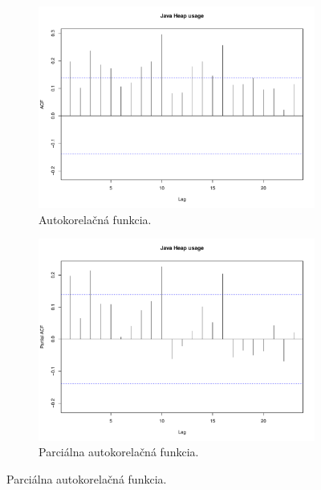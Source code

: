 \documentclass[12pt,a4paper,oneside,final]{article}
\theoremstyle{definition}
\theoremstyle{remark}
\numberwithin{equation}{section}
\begin{document}
\begin{figure}[H] \centering
    \begin{subfigure}[b]{0.45\textwidth}
        \centering
        \includegraphics[width=1\linewidth]{images/heap_acf.pdf}
        \caption{Autokorelačná funkcia.}
        \label{obr:heap_acf}
    \end{subfigure}
    \begin{subfigure}[b]{0.45\textwidth}
        \centering
        \includegraphics[width=1\linewidth]{images/heap_pacf.pdf}
        \caption{Parciálna autokorelačná funkcia.}
        \label{obr:heap_pacf}
    \end{subfigure}
\end{figure}
\end{document}
